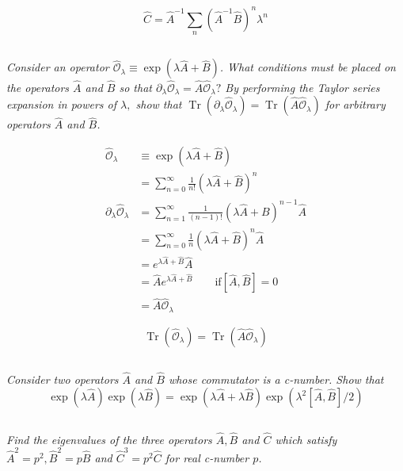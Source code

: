 \documentclass[12pt, letterpaper]{article}
\begin{document}
\begin{equation*}
    \boxed{\hat C= \hat{A}^{-1} \sum_n \left(\hat{A}^{-1} \hat{B}\right)^n \lambda^n}
\end{equation*}

\subsection{}
\textit{Consider an operator $\hat{\mathcal{O}}_{\lambda} \equiv \exp (\lambda \hat{A}+\hat{B})$. What conditions must be placed on the operators $\hat{A}$ and $\hat{B}$ so that $\partial_{\lambda} \hat{\mathcal{O}}_{\lambda}=\hat{A} \hat{\mathcal{O}}_{\lambda} ?$ By performing the Taylor series expansion in powers of $\lambda,$ show that $\operatorname{Tr}\left(\partial_{\lambda} \hat{\mathcal{O}}_{\lambda}\right)=\operatorname{Tr}\left(\hat{A} \hat{\mathcal{O}}_{\lambda}\right)$ for
arbitrary operators $\hat{A}$ and $\hat{B}$.}

\begin{align*}
    \hat{\mathcal{O}}_\lambda &\equiv \exp \left(\lambda \hat{A} + \hat{B} \right)\\
    &= \sum_{n=0}^{\infty} \frac{1}{n !}(\lambda \hat{A}+\hat{B})^{n}\\
    \partial_\lambda \hat{\mathcal{O}}_\lambda &= \sum_{n=1}^{\infty} \frac{1}{(n-1) !}(\lambda \hat{A}+B)^{n-1} \hat{A}\\
    &= \sum_{n=0}^{\infty} \frac{1}{n}(\lambda \hat{A}+\hat{B})^{n} \hat{A}\\
    &= e^{\lambda \hat{A}+\hat{B}} \hat{A} \\
    &= \hat{A} e^{\lambda \hat{A}+\hat{B}} \qquad \text{if} \left[\hat{A},\hat{B}\right] = 0 \\
    &= \hat A \hat{\mathcal{O}}_\lambda
\end{align*}

\begin{equation*}
\boxed{
    \operatorname{Tr}\left(\hat{\mathcal{O}}_\lambda \right) = \operatorname{Tr}\left(\hat A \hat{\mathcal{O}}_\lambda\right)
}
\end{equation*}

\subsection{}
\textit{Consider two operators $\hat{A}$ and $\hat{B}$ whose commutator is a c-number. Show that 
$$\exp (\lambda \hat{A}) \exp (\lambda \hat{B})=\exp \left(\lambda \hat{A}+\lambda \hat{B} \right)  \exp \left(\lambda^{2}[\hat{A}, \hat{B}] / 2\right)$$}


\subsection{}
\textit{Find the eigenvalues of the three operators $\hat{A}, \hat{B}$ and $\hat{C}$ which satisfy $\hat{A}^{2}=p^{2}, \hat{B}^{2}=p \hat{B}$ and $\hat{C}^{3}=p^{2} \hat{C}$ for real c-number $p$.}
\end{document}
